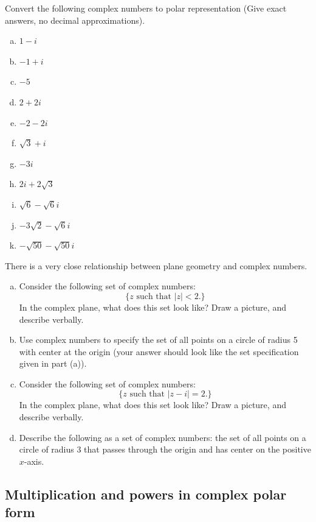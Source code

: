 \begin{exercise}{22}
Convert the following complex numbers to polar representation (Give exact answers, no decimal approximations).
\begin{multicols}{3}
\begin{enumerate}[(a)]
 
 \item
$1-i$
\item
$-1 + i$
 \item
$-5$
 \item
$2+2i$
\item
$-2 - 2i$
\item
$\sqrt{3} + i$
 \item
$-3i$
 \item
$2i + 2 \sqrt{3}$
\item
$\sqrt{6} - \sqrt{6}i$
\item
$-3\sqrt{2} - \sqrt{6}i$
\item
$-\sqrt{50} - \sqrt{50}i$
  
\end{enumerate}
\end{multicols}
\end{exercise}

\begin{exercise}{23}
There is a very close relationship between plane geometry and complex numbers.
\begin{enumerate}[(a)]
\item
Consider the following set of complex numbers:
\[ \{z \text{ such that } |z| < 2. \} \]
In the complex plane, what does this set look like? Draw a picture, and describe verbally.
\item
Use complex numbers to specify the set of all points on a circle of radius 5 with center at the origin (your answer should look like the set specification given in part (a)).
\item
Consider the following set of complex numbers:
\[ \{z \text{ such that } |z-i| = 2. \} \]
In the complex plane, what does this set look like? Draw a picture, and describe verbally.
\item
Describe the following as a set of complex numbers:  the set of all points on a circle of radius 3 that passes through the origin and has center on the positive $x$-axis.
\end{enumerate}
\end{exercise}

\subsection{Multiplication and powers in complex polar form}

